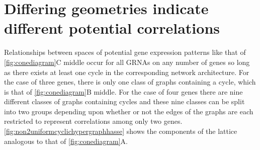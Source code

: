\section{Differing geometries indicate different potential correlations}
Relationships between spaces of potential gene expression patterns like that of \ref{fig:conediagram}C middle occur for all GRNAs on any number of genes so long as there exists at least one cycle in the corresponding network architecture. For the case of three genes, there is only one class of graphs containing a cycle, which is that of \ref{fig:conediagram}B middle. For the case of four genes there are nine different classes of graphs containing cycles and these nine classes can be split into two groups depending upon whether or not the edges of the graphs are each restricted to represent correlations among only two genes. \ref{fig:non2uniformcyclichypergraphhasse} shows the components of the lattice analogous to that of \ref{fig:conediagram}A.

